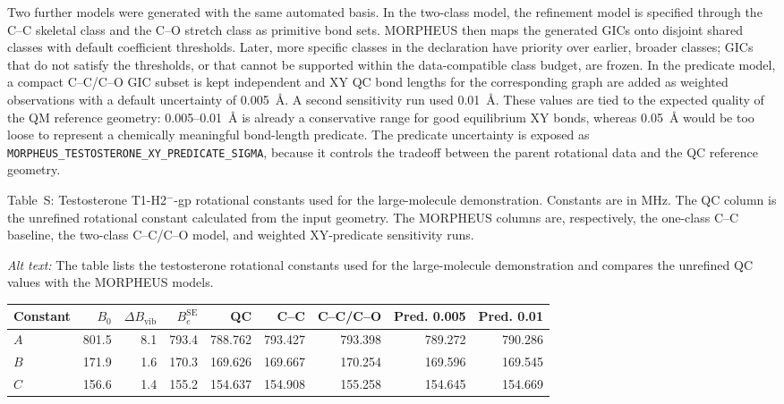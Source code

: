 \documentclass[12pt]{article}
\renewcommand{\thetable}{S\arabic{table}}
\begin{document}
Two further models were generated with the same automated basis. In the
two-class model, the refinement model is specified through the C--C skeletal
class and the C--O stretch class as primitive bond sets. MORPHEUS then maps the
generated GICs onto disjoint shared classes with default coefficient
thresholds. Later, more specific classes in the declaration have priority over
earlier, broader classes; GICs that do not satisfy the thresholds, or that
cannot be supported within the data-compatible class budget, are frozen. In the
predicate model, a compact C--C/C--O GIC subset is kept independent and XY QC
bond lengths for the corresponding graph are added as weighted observations
with a default uncertainty of 0.005~\AA{}. A second sensitivity run used
0.01~\AA{}. These values are tied to the expected quality of the QM reference
geometry: 0.005--0.01~\AA{} is already a conservative range for good
equilibrium XY bonds, whereas 0.05~\AA{} would be too loose to represent a
chemically meaningful bond-length predicate. The predicate uncertainty is
exposed as \texttt{MORPHEUS\_TESTOSTERONE\_XY\_PREDICATE\_SIGMA}, because it
controls the tradeoff between the parent rotational data and the QC reference
geometry.

\begin{center}
\label{tab:si-testosterone-rotconstants}
\parbox{0.94\linewidth}{\small Table~\thetable: Testosterone T1-H2$^{-}$-gp
rotational constants used for the large-molecule demonstration. Constants are in
MHz. The QC column is the unrefined rotational constant calculated from the
input geometry. The MORPHEUS columns are, respectively, the one-class C--C
baseline, the two-class C--C/C--O model, and weighted XY-predicate sensitivity
runs.}
\par\smallskip\noindent\textit{Alt text:} The table lists the testosterone rotational constants used for the large-molecule demonstration and compares the unrefined QC values with the MORPHEUS models.

\smallskip
\footnotesize
\setlength{\tabcolsep}{3pt}
\begin{tabular}{lrrrrrrrr}
\toprule
Constant & $B_0$ & $\Delta B_\mathrm{vib}$ & $B_e^\mathrm{SE}$ & QC & C--C & C--C/C--O & Pred. 0.005 & Pred. 0.01 \\
\midrule
$A$ & 801.5 & 8.1 & 793.4 & 788.762 & 793.427 & 793.398 & 789.272 & 790.286 \\
$B$ & 171.9 & 1.6 & 170.3 & 169.626 & 169.667 & 170.254 & 169.596 & 169.545 \\
$C$ & 156.6 & 1.4 & 155.2 & 154.637 & 154.908 & 155.258 & 154.645 & 154.669 \\
\bottomrule
\end{tabular}
\end{center}
\end{document}
